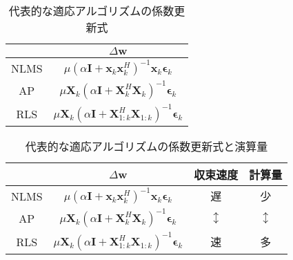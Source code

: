 \documentclass[a4paper]{ltjsarticle}
\begin{document}
  \begin{table}[h]
    \centering
    \caption{代表的な適応アルゴリズムの係数更新式}
    \label{tab:formula}
    \begin{tabular}{|c|c|}
    \hline
    & \(\Delta \symbf{w}\)                                                                                             \\ \hline
    NLMS        & \( \mu \left( \alpha \symbf{I} + \symbf{x}_k \symbf{x}_k^H \right)^{-1} \symbf{x}_k \symbf{\epsilon}_k \)        \\ \hline
    AP          & \(\mu \symbf{X}_k \left( \alpha \symbf{I} + \symbf{X}_k^H \symbf{X}_k \right)^{-1} \symbf{\epsilon}_k\)          \\ \hline
    RLS         & \( \mu \symbf{X}_k \left( \alpha \symbf{I} + \symbf{X}_{1:k}^H \symbf{X}_{1:k} \right)^{-1} \symbf{\epsilon}_k\) \\ \hline
    \end{tabular}
  \end{table}

  \begin{table}[]
    \centering
    \caption{代表的な適応アルゴリズムの係数更新式と演算量}
    \label{tab:formula_calc}
    \begin{tabular}{|c|c|c|c|}
    \hline
         & \(\Delta \symbf{w}\)                                                                                             & 収束速度             & 計算量              \\ \hline
    NLMS & \( \mu \left( \alpha \symbf{I} + \symbf{x}_k \symbf{x}_k^H \right)^{-1} \symbf{x}_k \symbf{\epsilon}_k \)        & 遅                & 少                \\ \hline
    AP   & \(\mu \symbf{X}_k \left( \alpha \symbf{I} + \symbf{X}_k^H \symbf{X}_k \right)^{-1} \symbf{\epsilon}_k\)          & \(\updownarrow\) & \(\updownarrow\) \\ \hline
    RLS  & \( \mu \symbf{X}_k \left( \alpha \symbf{I} + \symbf{X}_{1:k}^H \symbf{X}_{1:k} \right)^{-1} \symbf{\epsilon}_k\) & 速                & 多                \\ \hline
    \end{tabular}
    \end{table}


\end{document}
